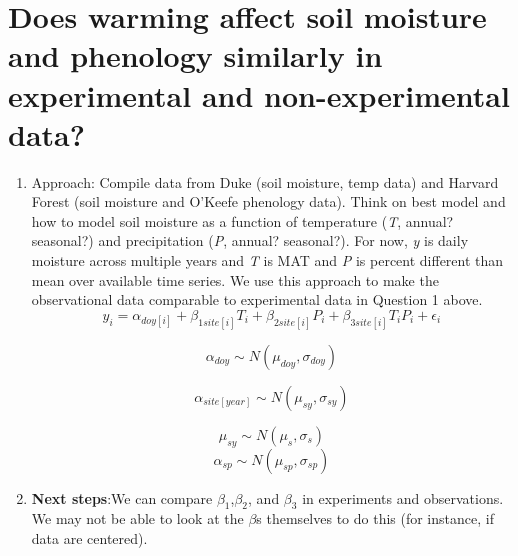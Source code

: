 \documentclass{article}
\begin{document}
\section{Does warming affect soil moisture and phenology similarly in experimental and non-experimental data?}
\begin{singlespace}

\begin{enumerate}
\item{Approach: Compile data from Duke (soil moisture, temp data) and Harvard Forest (soil moisture and O'Keefe phenology data). Think on best model and how to model soil moisture as a function of temperature (\textit{T}, annual? seasonal?) and precipitation (\textit{P}, annual? seasonal?). For now, \textit{y} is daily moisture across multiple years and \textit{T} is MAT and \textit{P} is percent different than mean over available time series. We use this approach to make the observational data comparable to experimental data in Question 1 above.}
\begin{equation}
y_{i}=\alpha_{doy[i]}+\beta_{1 site[i]}T_i+\beta_{2 site[i]}P_i+\beta_{3 site[i]}T_iP_i+\epsilon_{i}
\end{equation}

\begin{equation}
\alpha_{doy} \sim N(\mu_{doy}, \sigma_{doy})
\end{equation}

\begin{equation}
\alpha_{site[year]} \sim N(\mu_{sy}, \sigma_{sy})
\end{equation}

\begin{equation}
\mu_{sy} \sim N(\mu_{s}, \sigma_{s})
\end{equation}
\begin{equation}
\alpha_{sp} \sim N(\mu_{sp}, \sigma_{sp})
\end{equation}

\item{\textbf{Next steps}:We can compare \ensuremath{\beta_{1}},\ensuremath{\beta_{2}}, and \ensuremath{\beta_{3}} in experiments and observations. We may not be able to look at the \ensuremath{\beta}s themselves to do this (for instance, if data are centered).} 

\end{enumerate}
\end{singlespace}

\end{document}
